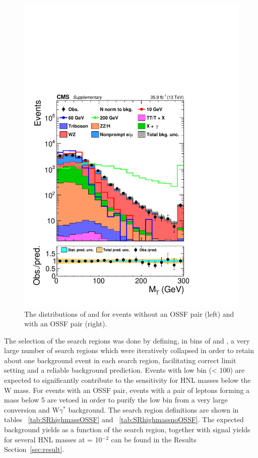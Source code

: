 \begin{figure}[h!]
\includegraphics[width=.4\textwidth]{Figures/c5/distribution/SR/mt_minMos_baseline_3lOSSF_withSignal_sigNormToBkg_log.pdf}
\caption{The distributions of \ptcone and \mtmin for
  events without an OSSF pair (left) and with an OSSF pair (right). \willem} 
\label{fig:mtminmm3lOSSF}
\end{figure}

The selection of the search regions was done by defining, in bins of
\mtmin and \mmin, a very large number of search regions which were
iteratively collapsed in order to retain about one background event in
each search region, facilitating correct limit setting and a reliable
background prediction. Events with low
\mlll bin (\mlll < 100\GeV) are expected to significantly contribute to
the sensitivity for HNL masses below the W mass. For events with an
OSSF pair, events with a pair of \lo leptons forming a mass below 5
\GeV are vetoed in order to purify the low \mlll bin from a very large
conversion and W$\gamma^{*}$ background. The search region definitions
are shown in tables ~\ref{tab:SRhighmassOSSF} and
~\ref{tab:SRhighmassnoOSSF}. The expected background yields as a
function of the search region, together with signal yields for several
HNL masses at \mixpar = 10$^{-2}$ can be found in the Results
Section~\ref{sec:result}.



